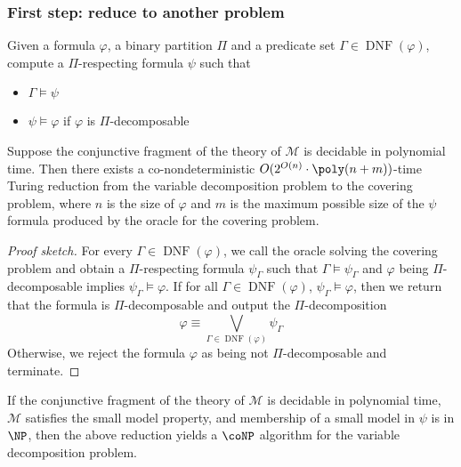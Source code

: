 \documentclass[handout]{beamer}
\def\Mstruct{\mathcal{M}}
\DeclareMathOperator{\Disjuncts}{DNF}
\def\DisjPhi{\Disjuncts(\varphi)}
\begin{document}
\begin{frame}
	\frametitle{First step: reduce to another problem}
	
	\begin{problem}
		Given a formula $ \varphi $, a binary partition $ \Pi $ and a predicate set $ \Gamma \in \DisjPhi $, compute a $ \Pi $-respecting formula $ \psi $ such that \begin{itemize}
			\item $ \Gamma \models \psi $
			\item $ \psi \models \varphi $ if $ \varphi $ is $ \Pi $-decomposable
		\end{itemize}
	\end{problem}
	
	\begin{theorem}
		Suppose the conjunctive fragment of the theory of $ \Mstruct $ is decidable in polynomial time. Then there exists a co-nondeterministic $ O(2^{O(n)} \cdot \poly(n + m)) $-time Turing reduction from the variable decomposition problem to the covering problem, where $ n $ is the size of $ \varphi $ and $ m $ is the maximum possible size of the $ \psi $ formula produced by the oracle for the covering problem.
	\end{theorem}
	
\end{frame}

\begin{frame}
	
	\begin{proof}[Proof sketch]
		For every $ \Gamma \in \DisjPhi $, we call the oracle solving the covering problem and obtain a $ \Pi $-respecting formula $ \psi_\Gamma $ such that $ \Gamma \models \psi_\Gamma $ and $ \varphi $ being $ \Pi $-decomposable implies $ \psi_\Gamma \models \varphi $. If for all $ \Gamma \in \DisjPhi $, $ \psi_\Gamma \models \varphi $, then we return that the formula is $ \Pi $-decomposable and output the $ \Pi $-decomposition \[
		\varphi \equiv \bigvee_{\Gamma \in \DisjPhi} \psi_\Gamma
		\] Otherwise, we reject the formula $ \varphi $ as being not $ \Pi $-decomposable and terminate.
	\end{proof}

	\begin{theorem}
		If the conjunctive fragment of the theory of $ \Mstruct $ is decidable in polynomial time, $ \Mstruct $ satisfies the small model property, and membership of a small model in $ \psi $ is in $ \NP $, then the above reduction yields a $ \coNP $ algorithm for the variable decomposition problem.
	\end{theorem}
	
\end{frame}
\end{document}
